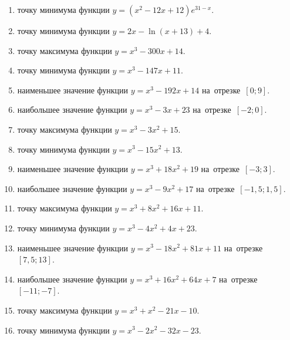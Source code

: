 \documentclass[a4paper,10pt]{article}
\begin{document}
\begin{enumerate}
\item {} точку минимума функции $y=\left(x^2-12x+12\right){{e}^{31-x}}$.

\item {} точку минимума функции $y=2x-\ln \left(x+13\right)+4$.

\item {} точку максимума функции $y=x^3 -300x +14$.

\item {} точку минимума функции $y=x^3 -147x+11$.

\item {} наименьшее значение функции $y=x^3 -192x+14$ на~отрезке~$\left[0;9\right]$.

\item {} наибольшее значение функции $y=x^3 -3x+23$ на~отрезке~$\left[-2;0\right]$.

\item {} точку максимума функции $y=x^3 -3x^2+15$.

\item {} точку минимума функции $y=x^3 -15x^2+13$.

\item {} наименьшее значение функции $y=x^3 +18x^2+19$ на~отрезке~$\left[-3;3\right]$.

\item {} наибольшее значение функции $y=x^3 -9x^2+17$ на~отрезке~$\left[-1,5;1,5\right]$.

\item {} точку максимума функции $y=x^3 +8x^2+16x+11$.

\item {} точку минимума функции $y=x^3 -4x^2+4x+23$.

\item {} наименьшее значение функции $y=x^3 -18x^2+81x+11$ на~отрезке~$\left[7,5;13\right]$.

\item {} наибольшее значение функции $y=x^3 +16x^2+64x+7$ на~отрезке~$\left[-11;-7\right]$.

\item {} точку максимума функции $y=x^3 +x^2-21x-10$.

\item {} точку минимума функции $y=x^3 -2x^2-32x-23$.


\end{enumerate}
\end{document}
